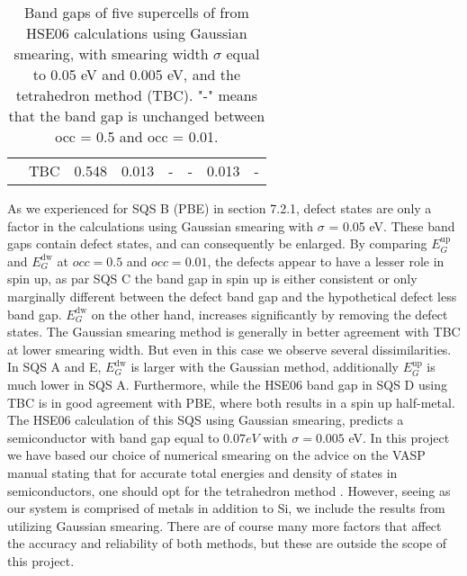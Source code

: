\begin{landscape}
\begin{table}[]
\begin{tabular}{@{}cccccccc@{}}
\multicolumn{1}{c|}{}                            & TBC                                                           & 0.548                                                                        & 0.013                                                                        & -                                                                              & -                                                                              & 0.013                                                                         & -                                                                                     \\ \cmidrule(l){2-8} 
\end{tabular}
\caption{Band gaps of five supercells of  from HSE06 calculations using Gaussian smearing, with smearing width $\sigma$ equal to 0.05 eV and 0.005 eV, and the tetrahedron method (TBC). "-"  means that the band gap is unchanged between occ = 0.5 and occ = 0.01.}
\end{table}
\end{landscape}
\newpage

As we experienced for SQS B (PBE) in section 7.2.1, defect states are only a factor in the calculations using Gaussian smearing with $\sigma$ = 0.05 eV. These band gaps contain defect states, and can consequently be enlarged. By comparing $E_G ^\text{up}$ and $E_G ^\text{dw}$ at $occ = 0.5$ and $occ = 0.01$, the defects appear to have a lesser role in spin up, as par SQS C the band gap in spin up is either consistent or only marginally different between the defect band gap and the hypothetical defect less band gap. $E_G ^\text{dw}$ on the other hand, increases significantly by removing the defect states. The Gaussian smearing method is generally in better agreement with TBC at lower smearing width. But even in this case we observe several dissimilarities. In SQS A and E, $E_G ^\text{dw}$ is larger with the Gaussian method, additionally $E_G ^\text{up}$ is much lower in SQS A. Furthermore, while the HSE06 band gap in SQS D using TBC is in good agreement with PBE, where both results in a spin up half-metal. The HSE06 calculation of this SQS using Gaussian smearing, predicts a semiconductor with band gap equal to $0.07 eV$ with $\sigma = 0.005$ eV. In this project we have based our choice of numerical smearing on the advice on the VASP manual stating that for accurate total energies and density of states in semiconductors, one should opt for the tetrahedron method \cite{ismear}.  However, seeing as our system is comprised of metals in addition to Si, we include the results from utilizing Gaussian smearing. There are of course many more factors that affect the accuracy and reliability of both methods, but these are outside the scope of this project.

